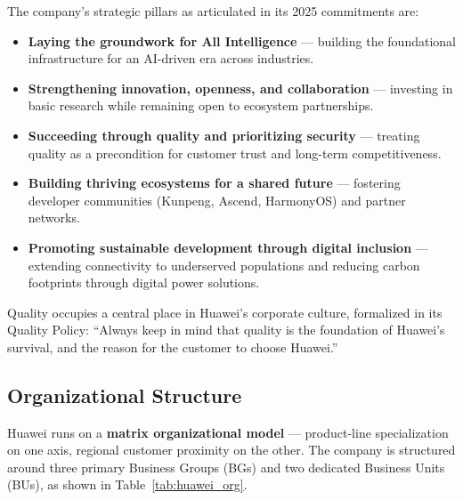 The company's strategic pillars as articulated in its 2025 commitments are:
\begin{itemize}
    \item \textbf{Laying the groundwork for All Intelligence} --- building the 
    foundational infrastructure for an AI-driven era across industries.
    \item \textbf{Strengthening innovation, openness, and collaboration} --- investing 
    in basic research while remaining open to ecosystem partnerships.
    \item \textbf{Succeeding through quality and prioritizing security} --- treating 
    quality as a precondition for customer trust and long-term competitiveness.
    \item \textbf{Building thriving ecosystems for a shared future} --- fostering 
    developer communities (Kunpeng, Ascend, HarmonyOS) and partner networks.
    \item \textbf{Promoting sustainable development through digital inclusion} --- 
    extending connectivity to underserved populations and reducing carbon footprints 
    through digital power solutions.
\end{itemize}

Quality occupies a central place in Huawei's corporate culture, formalized in its 
Quality Policy: ``Always keep in mind that quality is the foundation of Huawei's 
survival, and the reason for the customer to choose Huawei.''

\subsection{Organizational Structure}

Huawei runs on a \textbf{matrix organizational model} --- product-line specialization 
on one axis, regional customer proximity on the other. The company is structured around 
three primary Business Groups (BGs) and two dedicated Business Units (BUs), as shown 
in Table~\ref{tab:huawei_org}.

